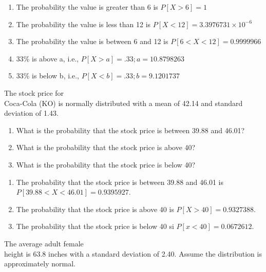 \documentclass[11pt, chapterprefix=true]{scrbook}\usepackage[]{graphicx}\usepackage[]{color}
\begin{document}
\begin{exercises}
\begin{solution}
\begin{enumerate}
\item The probability the value is greater than 6 is $P[X > 6] = 1$
\item The probability the value is less than 12 is $P[X < 12] = \ensuremath{3.3976731\times 10^{-6}}$
\item The probability the value is between 6 and 12 is $P[ 6 < X < 12] = 0.9999966$
\item 33\% is above a, i.e., $P[X > a] = .33; a = 10.8798263$
\item 33\% is below b, i.e., $P[X < b] = .33; b = 9.1201737$
\end{enumerate}
	\end{solution}

  \begin{exercise}	%

The stock price for \\ Coca-Cola (KO) is normally distributed with a mean of 42.14 and standard deviation of 1.43.

\begin{enumerate}
\item What is the probability that the stock price is between 39.88 and 46.01?
\item What is the probability that the stock price is above 40?
\item What is the probability that the stock price is below 40?
\end{enumerate}

  \end{exercise}
\begin{solution}  %


\begin{enumerate}
\item The probability that the stock price is between 39.88 and 46.01 is $P[39.88 < X < 46.01] = 0.9395927$.
\item The probability that the stock price is above 40 is $P[X > 40] = 0.9327388$.
\item The probability that the stock price is below 40 si $P[ x < 40] = 0.0672612$.
\end{enumerate}
\end{solution}

\begin{exercise}  %

The average adult female \\ height is 63.8 inches with a standard deviation of 2.40. Assume the distribution is approximately normal.


\end{exercise}
\end{exercises}
\end{document}
